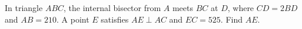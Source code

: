 In triangle $ABC$, the internal bisector from $A$ meets $BC$ at $D$, where $CD=2BD$ and $AB=210$. A point $E$ satisfies $AE\perp AC$ and $EC=525$. Find $AE$.
